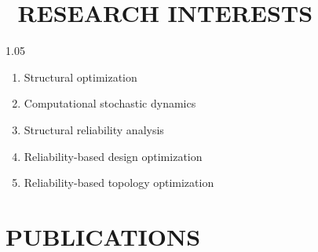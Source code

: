 \documentclass{resume}
\begin{document}
\section{\faChartBar\, RESEARCH INTERESTS}
\begin{spacing}{1.05}
\begin{enumerate} [itemsep=3pt,topsep=2pt,parsep=0pt]
    \item Structural optimization
    \item Computational stochastic dynamics 
    \item Structural reliability analysis
    \item Reliability-based design optimization
    \item Reliability-based topology optimization
\end{enumerate}
\end{spacing}

\vspace{-12pt}
\section{\faBook\;\; PUBLICATIONS}
\end{document}
